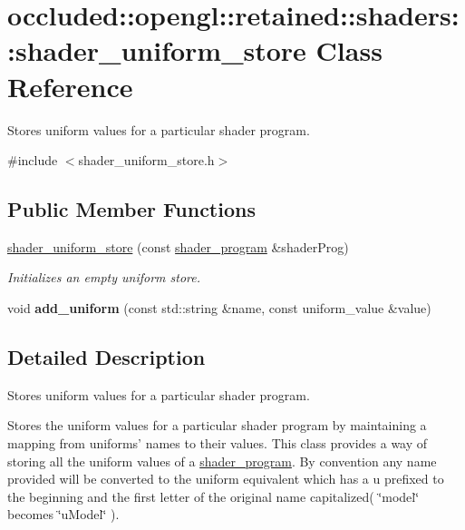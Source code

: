 \hypertarget{classoccluded_1_1opengl_1_1retained_1_1shaders_1_1shader__uniform__store}{\section{occluded\+:\+:opengl\+:\+:retained\+:\+:shaders\+:\+:shader\+\_\+uniform\+\_\+store Class Reference}
\label{classoccluded_1_1opengl_1_1retained_1_1shaders_1_1shader__uniform__store}
}


Stores uniform values for a particular shader program.  




{\ttfamily \#include $<$shader\+\_\+uniform\+\_\+store.\+h$>$}

\subsection*{Public Member Functions}
\begin{DoxyCompactItemize}
\item 
\hyperlink{classoccluded_1_1opengl_1_1retained_1_1shaders_1_1shader__uniform__store_a862db8afb99f17ec1b14c3e9a882618e}{shader\+\_\+uniform\+\_\+store} (const \hyperlink{classoccluded_1_1opengl_1_1retained_1_1shaders_1_1shader__program}{shader\+\_\+program} \&shader\+Prog)
\begin{DoxyCompactList}\small\item\em Initializes an empty uniform store. \end{DoxyCompactList}\item 
\hypertarget{classoccluded_1_1opengl_1_1retained_1_1shaders_1_1shader__uniform__store_ae7e6d5638d60cb1a7feac886316fdf8f}{void {\bfseries add\+\_\+uniform} (const std\+::string \&name, const uniform\+\_\+value \&value)}\label{classoccluded_1_1opengl_1_1retained_1_1shaders_1_1shader__uniform__store_ae7e6d5638d60cb1a7feac886316fdf8f}

\end{DoxyCompactItemize}


\subsection{Detailed Description}
Stores uniform values for a particular shader program. 

Stores the uniform values for a particular shader program by maintaining a mapping from uniforms' names to their values. This class provides a way of storing all the uniform values of a \hyperlink{classoccluded_1_1opengl_1_1retained_1_1shaders_1_1shader__program}{shader\+\_\+program}. By convention any name provided will be converted to the uniform equivalent which has a u prefixed to the beginning and the first letter of the original name capitalized( \char`\"{}model\char`\"{} becomes \char`\"{}u\+Model\char`\"{} ). 

